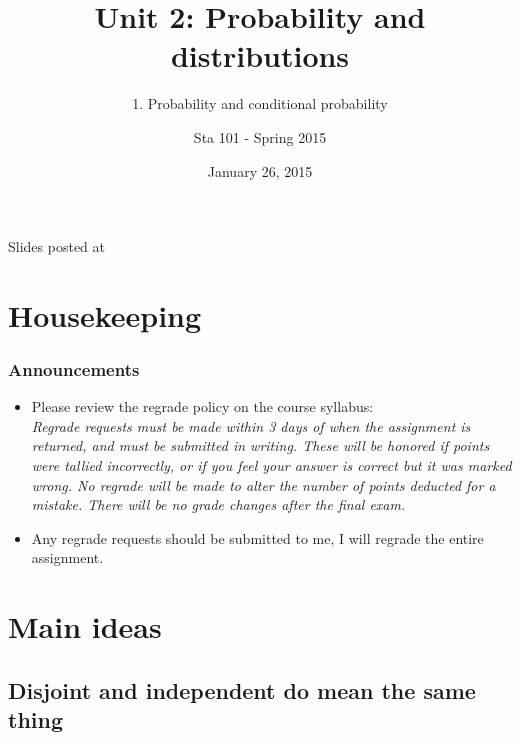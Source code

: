 \documentclass[slidestop,compress,mathserif,12pt,t,professionalfonts,xcolor=table]{beamer}
\title{Unit 2: Probability and distributions}
\subtitle{1. Probability and conditional probability}
\author{Sta 101 - Spring 2015}
\date{January 26, 2015}
\institute{Duke University, Department of Statistical Science}
\begin{document}



\begin{frame}[plain]

\titlepage
\vfill
{\scriptsize {} \hfill Slides posted at  \webLink{\CourseSite}{\CourseSite}}
\addtocounter{framenumber}{-1} 

\end{frame}


\section{Housekeeping}


\begin{frame}
\frametitle{Announcements}

\begin{itemize}

\item Please review the regrade policy on the course syllabus: \\
{\footnotesize \textit{Regrade requests must be made within 3 days of when the assignment is returned, and must be submitted in writing. These will be honored if points were tallied incorrectly, or if you feel your answer is correct but it was marked wrong. No regrade will be made to alter the number of points deducted for a mistake. There will be no grade changes after the final exam.}}

\item Any regrade requests should be submitted to me, I will regrade the entire assignment.

\end{itemize}

\end{frame}


\section{Main ideas}


\subsection{Disjoint and independent do mean the same thing}
\label{mi1}
\end{document}
